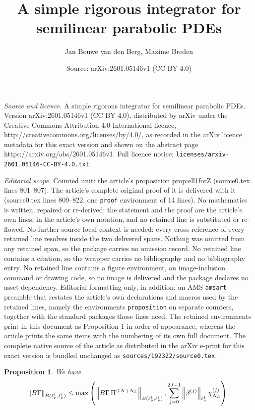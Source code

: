 \documentclass[10pt,a4paper]{amsart}
\title{A simple rigorous integrator for semilinear parabolic PDEs}
\author{Jan Bouwe van den Berg, Maxime Breden}
\date{Source: arXiv:2601.05146v1 (CC BY 4.0)}
\newtheorem{proposition}{Proposition}
\renewcommand{\L}{\mathcal{L}}
\newcommand{\NL}{N_{\text{\tiny{$\L$}}}}
\newcommand{\bN}{\bar{N}}
\begin{document}
\maketitle

\noindent\emph{Source and licence.} A simple rigorous integrator for semilinear parabolic PDEs. Version arXiv:2601.05146v1 (CC BY 4.0), distributed by arXiv under the Creative Commons Attribution 4.0 International licence, http://creativecommons.org/licenses/by/4.0/, as recorded in the arXiv licence metadata for this exact version and shown on the abstract page https://arxiv.org/abs/2601.05146v1. Full licence notice: \texttt{licenses/arxiv-2601.05146-CC-BY-4.0.txt}.\par\smallskip

\noindent\textit{Editorial scope.} Counted unit: the article's proposition prop:ell1forZ (source0.tex lines 801--807). The article's complete original proof of it is delivered with it (source0.tex lines 809--822, one \texttt{proof} environment of 14 lines). No mathematics is written, repaired or re-derived: the statement and the proof are the article's own lines, in the article's own notation, and no retained line is substituted or re-flowed.  No further source-local context is needed: every cross-reference of every retained line resolves inside the two delivered spans.  Nothing was omitted from any retained span, so the package carries no omission record.  No retained line contains a citation, so the wrapper carries no bibliography and no bibliography entry.  No retained line contains a figure environment, an image-inclusion command or drawing code, so no image is delivered and the package declares no asset dependency.  Editorial formatting only, in addition: an AMS \texttt{amsart} preamble that restates the article's own declarations and macros used by the retained lines, namely the environments \texttt{proposition} on separate counters, together with the standard packages those lines need.  The retained environments print in this document as Proposition 1 in order of appearance, whereas the article prints the same items with the numbering of its own full document.  The complete native source of the article as distributed in the arXiv e-print for this exact version is bundled unchanged as \texttt{sources/192322/source0.tex}.
\begin{proposition}
\label{prop:ell1forZ}
We have
\begin{align*}
\left\Vert B\Gamma \right\Vert_{B(\ell^1_\nu,\ell^1_\nu)} \leq \max\left( \left\Vert B\Gamma \, \Pi^{\leq \bN+\NL} \right\Vert_{B(\ell^1_\nu,\ell^1_\nu)}, \sum_{j=0}^{2J-1} \left\Vert \beta^{(j)}\right\Vert_{\ell^1_\nu} \chi^{(j)}_{\NL}\right).
\end{align*}
\end{proposition}
\end{document}
